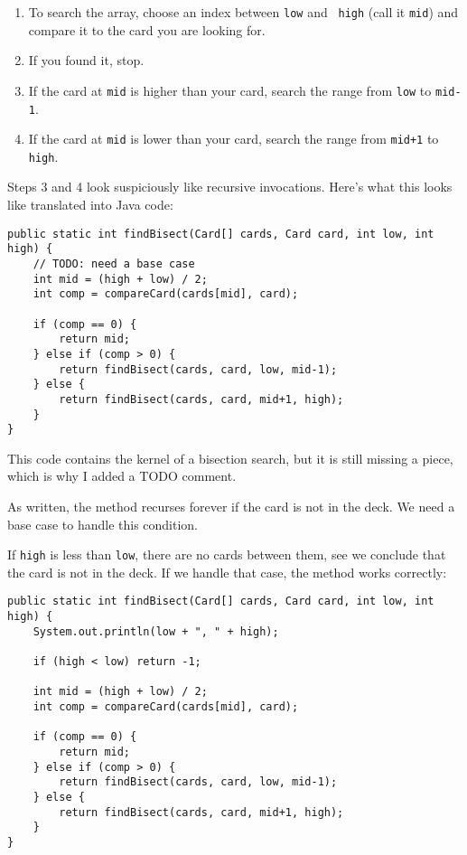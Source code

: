 \documentclass[12pt]{book}
\theoremstyle{definition}
\begin{document}
\begin{enumerate}

\item To search the array, choose an index between {\tt low} and {\tt
high} (call it {\tt mid}) and compare it to the card you are looking
for.

\item If you found it, stop.

\item If the card at {\tt mid} is higher than your card, search
the range from {\tt low} to {\tt mid-1}.

\item If the card at {\tt mid} is lower than your card, search
the range from {\tt mid+1} to {\tt high}.

\end{enumerate}

Steps 3 and 4 look suspiciously like recursive invocations.  Here's
what this looks like translated into Java code:

\begin{lstlisting}
public static int findBisect(Card[] cards, Card card, int low, int high) {
    // TODO: need a base case
    int mid = (high + low) / 2;
    int comp = compareCard(cards[mid], card);

    if (comp == 0) {
        return mid;
    } else if (comp > 0) {
        return findBisect(cards, card, low, mid-1);
    } else {
        return findBisect(cards, card, mid+1, high);
    }
}
\end{lstlisting}
%
This code contains the kernel of a bisection search, but it
is still missing a piece, which is why I added a TODO comment.

As written, the method recurses forever 
if the card is not in the deck.  We
need a base case to handle this condition.

If {\tt high} is less than {\tt low},
there are no cards between them,
see we conclude that the card is not in the deck.
If we handle that case, the method works correctly:

\begin{lstlisting}
public static int findBisect(Card[] cards, Card card, int low, int high) {
    System.out.println(low + ", " + high);

    if (high < low) return -1;

    int mid = (high + low) / 2;
    int comp = compareCard(cards[mid], card);

    if (comp == 0) {
        return mid;
    } else if (comp > 0) {
        return findBisect(cards, card, low, mid-1);
    } else {
        return findBisect(cards, card, mid+1, high);
    }
}
\end{lstlisting}
\end{document}
